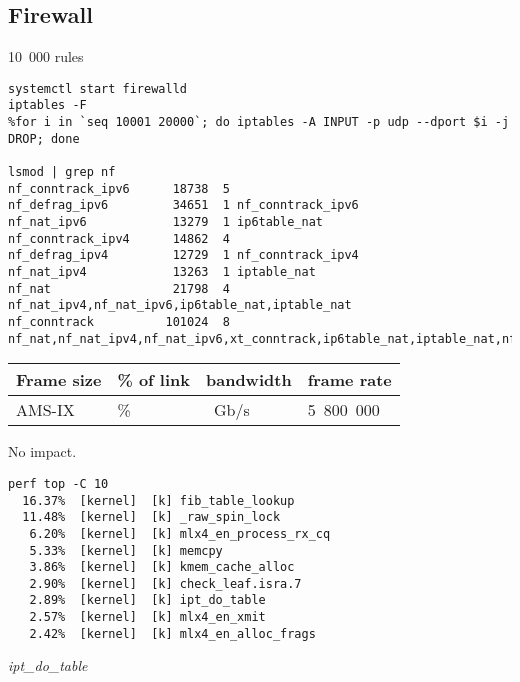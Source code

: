 
\subsection{Firewall}
10~000 rules
\begin{lstlisting}
systemctl start firewalld
iptables -F
%for i in `seq 10001 20000`; do iptables -A INPUT -p udp --dport $i -j DROP; done

lsmod | grep nf
nf_conntrack_ipv6      18738  5 
nf_defrag_ipv6         34651  1 nf_conntrack_ipv6
nf_nat_ipv6            13279  1 ip6table_nat
nf_conntrack_ipv4      14862  4 
nf_defrag_ipv4         12729  1 nf_conntrack_ipv4
nf_nat_ipv4            13263  1 iptable_nat
nf_nat                 21798  4 nf_nat_ipv4,nf_nat_ipv6,ip6table_nat,iptable_nat
nf_conntrack          101024  8 nf_nat,nf_nat_ipv4,nf_nat_ipv6,xt_conntrack,ip6table_nat,iptable_nat,nf_conntrack_ipv4,nf_conntrack_ipv6
\end{lstlisting}

\begin{tabular}{ | l | l | l | l | }
\hline
Frame size & \% of link & bandwidth & frame rate \\
\hline
AMS-IX & \% & ~Gb/s & 5~800~000 \\
\hline
\end{tabular}
No impact.

\begin{lstlisting}
perf top -C 10
  16.37%  [kernel]  [k] fib_table_lookup
  11.48%  [kernel]  [k] _raw_spin_lock
   6.20%  [kernel]  [k] mlx4_en_process_rx_cq
   5.33%  [kernel]  [k] memcpy
   3.86%  [kernel]  [k] kmem_cache_alloc
   2.90%  [kernel]  [k] check_leaf.isra.7
   2.89%  [kernel]  [k] ipt_do_table
   2.57%  [kernel]  [k] mlx4_en_xmit
   2.42%  [kernel]  [k] mlx4_en_alloc_frags
\end{lstlisting}

{\it{ipt\_do\_table}}

